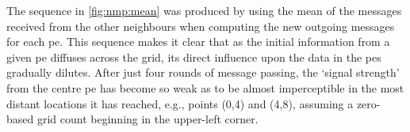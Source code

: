 The sequence in \autoref{fig:nmp:mean} was produced by using the mean of the messages received from the other neighbours when computing the new outgoing messages for each \gls{pe}.  This sequence makes it clear that as the initial information from a given \gls{pe} diffuses across the grid, its direct influence upon the data in the \glspl{pe} gradually dilutes.  After just four rounds of message passing, the `signal strength' from the centre \gls{pe} has become so weak as to be almost imperceptible in the most distant locations it has reached, e.g., points (0,4) and (4,8), assuming a zero-based grid count beginning in the upper-left corner.